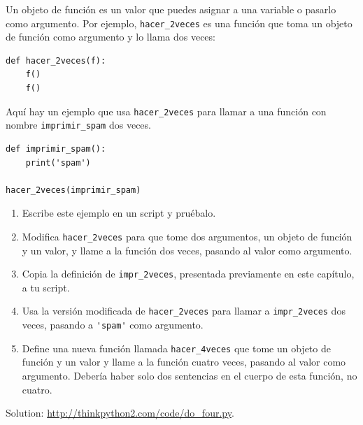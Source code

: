 \documentclass[10pt]{book}
\begin{document}
\begin{exercise}

Un objeto de función es un valor que puedes asignar a una variable o
pasarlo como argumento.  Por ejemplo, \verb"hacer_2veces" es una función
que toma un objeto de función como argumento y lo llama dos veces:

\begin{verbatim}
def hacer_2veces(f):
    f()
    f()
\end{verbatim}

Aquí hay un ejemplo que usa \verb"hacer_2veces" para llamar a una función
con nombre \verb"imprimir_spam" dos veces.

\begin{verbatim}
def imprimir_spam():
    print('spam')

hacer_2veces(imprimir_spam)
\end{verbatim}

\begin{enumerate}

\item Escribe este ejemplo en un script y pruébalo.

\item Modifica \verb"hacer_2veces" para que tome dos argumentos, un
objeto de función y un valor, y llame a la función dos veces,
pasando al valor como argumento.

\item Copia la definición de
\verb"impr_2veces", presentada previamente en este capítulo, a tu script.

\item Usa la versión modificada de \verb"hacer_2veces" para llamar a
\verb"impr_2veces" dos veces, pasando a \verb"'spam'" como argumento.

\item Define una nueva función llamada
\verb"hacer_4veces" que tome un objeto de función y un valor
y llame a la función cuatro veces, pasando al valor
como argumento.  Debería haber solo
dos sentencias en el cuerpo de esta función, no cuatro.

\end{enumerate}

Solution: \url{http://thinkpython2.com/code/do_four.py}.

\end{exercise}
\end{document}
